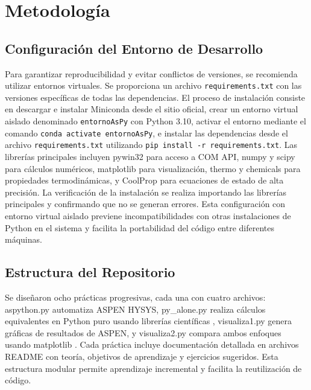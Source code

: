 \documentclass{syx7}
\begin{document}
\section{Metodología}

\subsection{Configuración del Entorno de Desarrollo}

Para garantizar reproducibilidad y evitar conflictos de versiones, se recomienda utilizar entornos virtuales. Se proporciona un archivo \texttt{requirements.txt} con las versiones específicas de todas las dependencias. El proceso de instalación consiste en descargar e instalar Miniconda desde el sitio oficial, crear un entorno virtual aislado denominado \texttt{entornoAsPy} con Python 3.10, activar el entorno mediante el comando \texttt{conda activate entornoAsPy}, e instalar las dependencias desde el archivo \texttt{requirements.txt} utilizando \texttt{pip install -r requirements.txt}. Las librerías principales incluyen pywin32 para acceso a COM API, numpy y scipy \cite{virtanen2020scipy} para cálculos numéricos, matplotlib \cite{hunter2007matplotlib} para visualización, thermo y chemicals \cite{thermo2023,chemicals2023} para propiedades termodinámicas, y CoolProp \cite{bell2016coolprop} para ecuaciones de estado de alta precisión. La verificación de la instalación se realiza importando las librerías principales y confirmando que no se generan errores. Esta configuración con entorno virtual aislado previene incompatibilidades con otras instalaciones de Python en el sistema y facilita la portabilidad del código entre diferentes máquinas.

\subsection{Estructura del Repositorio}

Se diseñaron ocho prácticas progresivas, cada una con cuatro archivos: aspython.py automatiza ASPEN HYSYS, py\_alone.py realiza cálculos equivalentes en Python puro usando librerías científicas \cite{thermo2023,chemicals2023,bell2016coolprop}, visualiza1.py genera gráficas de resultados de ASPEN, y visualiza2.py compara ambos enfoques usando matplotlib \cite{hunter2007matplotlib}. Cada práctica incluye documentación detallada en archivos README con teoría, objetivos de aprendizaje y ejercicios sugeridos. Esta estructura modular permite aprendizaje incremental y facilita la reutilización de código.
\end{document}
